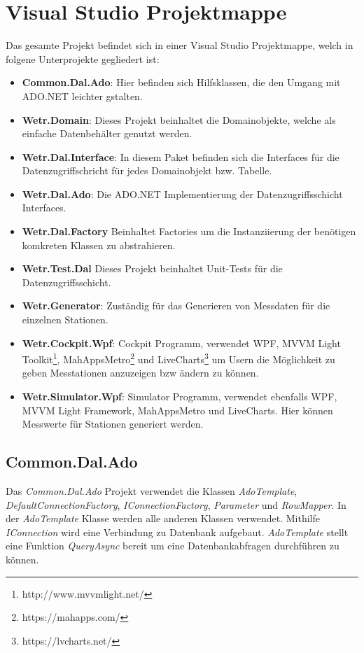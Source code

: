 \section{Visual Studio Projektmappe}

Das gesamte Projekt befindet sich in einer Visual Studio Projektmappe, welch in folgene Unterprojekte gegliedert ist:
\begin{itemize}
    \item \textbf{Common.Dal.Ado}: Hier befinden sich Hilfsklassen, die den Umgang mit ADO.NET leichter gstalten.
    \item \textbf{Wetr.Domain}: Dieses Projekt beinhaltet die Domainobjekte, welche als einfache Datenbehälter genutzt werden.
    \item \textbf{Wetr.Dal.Interface}: In diesem Paket befinden sich die Interfaces für die Datenzugriffschricht für jedes Domainobjekt bzw. Tabelle.
    \item \textbf{Wetr.Dal.Ado}: Die ADO.NET Implementierung der Datenzugriffsschicht Interfaces.
    \item \textbf{Wetr.Dal.Factory} Beinhaltet Factories um die Instanziierung der benötigen komkreten Klassen zu abstrahieren.
    \item \textbf{Wetr.Test.Dal} Dieses Projekt beinhaltet Unit-Tests für die Datenzugriffsschicht.
    \item \textbf{Wetr.Generator}: Zuständig für das Generieren von Messdaten für die einzelnen Stationen.
    \item \textbf{Wetr.Cockpit.Wpf}: Cockpit Programm, verwendet WPF, MVVM Light Toolkit\footnote{http://www.mvvmlight.net/}, MahAppsMetro\footnote{https://mahapps.com/} und LiveCharts\footnote{https://lvcharts.net/} um Usern die Möglichkeit zu geben Messtationen anzuzeigen bzw ändern zu können.
    \item \textbf{Wetr.Simulator.Wpf}: Simulator Programm, verwendet ebenfalls WPF, MVVM Light Framework, MahAppsMetro und LiveCharts. Hier können Messwerte für Stationen generiert werden.
\end{itemize}

\newpage
\subsection{Common.Dal.Ado}
Das \textit{Common.Dal.Ado} Projekt verwendet die Klassen \textit{AdoTemplate}, \textit{DefaultConnectionFactory}, \textit{IConnectionFactory}, \textit{Parameter} und  \textit{RowMapper}. In der  \textit{AdoTemplate} Klasse werden alle anderen Klassen verwendet. Mithilfe  \textit{IConnection} wird eine Verbindung zu Datenbank aufgebaut.  \textit{AdoTemplate} stellt eine Funktion  \textit{QueryAsync} bereit um eine Datenbankabfragen durchführen zu können.


